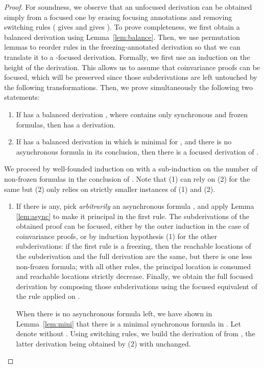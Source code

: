 \begin{proof}
For soundness, we observe that an unfocused derivation can be obtained
simply from a focused one by erasing focusing annotations
and removing switching rules
( gives  and
  gives ).
To prove completeness, we first obtain a balanced derivation using
Lemma~\ref{lem:balance}. Then, we use permutation lemmas to reorder rules
in the freezing-annotated derivation so that we
can translate it to a -focused derivation.
Formally, we first use an induction on the height of the derivation.
This allows us to assume that coinvariance proofs can be focused,
which will be preserved since those subderivations are left untouched
by the following transformations.
Then, we prove simultaneously the following two statements:
\begin{enumerate}
\item
  If  has a balanced derivation ,
  where  contains only synchronous and frozen formulas,
  then  has a derivation.
\item
  If  has a balanced derivation 
  in which  is minimal for ,
  and there is no asynchronous formula in its conclusion,
  then there is a focused derivation of .
\end{enumerate}
We proceed by well-founded induction on 
with a sub-induction on the number of non-frozen formulas in the
conclusion of .
Note that (1) can rely on (2) for the same  but
(2) only relies on strictly smaller instances of (1) and (2).
\begin{enumerate}
\item
If there is any, pick \emph{arbitrarily} an asynchronous formula ,
and apply Lemma \ref{lem:async} to make it principal in the first rule.
The subderivations of the obtained proof can be focused,
either by the outer induction in the case of coinvariance proofs,
or by induction hypothesis (1) for the other subderivations:
if the first rule is a freezing, then the reachable locations of the
subderivation and the full derivation are the same, but there is one
less non-frozen formula;
with all other rules, the principal location is consumed
and reachable locations strictly decrease.
Finally, we obtain the full focused derivation by composing those
subderivations using the focused equivalent of the rule applied on .

When there is no asynchronous formula left, we have shown
in Lemma~\ref{lem:mini} that there is a minimal synchronous formula 
in .
Let  denote  without .
Using switching rules,
we build the derivation of 
from ,
the latter derivation being obtained by (2) with  unchanged.


\end{enumerate}
\end{proof}
